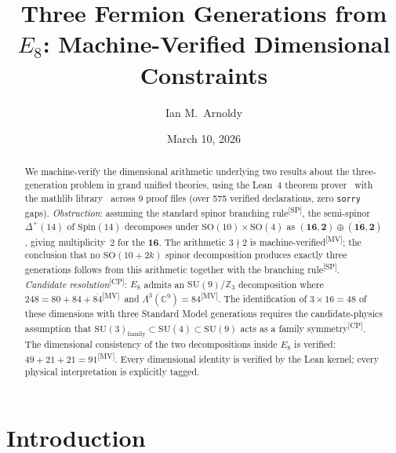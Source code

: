 \documentclass[aps,prl,twocolumn,showpacs,preprintnumbers,superscriptaddress,floatfix]{revtex4-2}
\newcommand{\MV}{\textsuperscript{[MV]}}
\newcommand{\CP}{\textsuperscript{[CP]}}
\newcommand{\SP}{\textsuperscript{[SP]}}
\begin{document}

\title{Three Fermion Generations from $E_8$: Machine-Verified
Dimensional Constraints}

\author{Ian M.~Arnoldy}

\date{March 10, 2026}

\begin{abstract}
We machine-verify the dimensional arithmetic underlying two results
about the three-generation problem in grand unified theories,
using the Lean~4 theorem prover~\cite{demoura2021lean4}
with the mathlib library~\cite{mathlib} across 9 proof files
(over 575 verified declarations, zero \texttt{sorry} gaps).
\emph{Obstruction}: assuming the standard spinor branching
rule\SP, the semi-spinor $\Delta^+(14)$ of $\mathrm{Spin}(14)$
decomposes under $\mathrm{SO}(10) \times \mathrm{SO}(4)$ as
$(\mathbf{16},\mathbf{2}) \oplus (\overline{\mathbf{16}},\mathbf{2})$,
giving multiplicity~2 for the $\mathbf{16}$.  The arithmetic
$3 \nmid 2$ is machine-verified\MV; the conclusion that no
$\mathrm{SO}(10{+}2k)$ spinor decomposition produces exactly three
generations follows from this arithmetic together with the
branching rule\SP.
\emph{Candidate resolution}\CP: $E_8$ admits an $\mathrm{SU}(9)/\mathbb{Z}_3$
decomposition where $248 = 80 + 84 + \overline{84}$\MV\ and
$\Lambda^3(\mathbb{C}^9) = 84$\MV.  The identification of
$3 \times 16 = 48$ of these dimensions with three Standard Model
generations requires the candidate-physics assumption that
$\mathrm{SU}(3)_{\mathrm{family}} \subset
\mathrm{SU}(4) \subset \mathrm{SU}(9)$ acts as a family
symmetry\CP.
The dimensional consistency of the two decompositions inside $E_8$
is verified: $49 + 21 + 21 = 91$\MV.
Every dimensional identity is verified by the Lean kernel;
every physical interpretation is explicitly tagged.
\end{abstract}


\maketitle

\section{Introduction}
\label{sec:intro}
\end{document}
